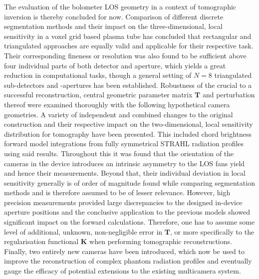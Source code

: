         The evaluation of the bolometer LOS geometry in a context of tomographic inversion is thereby concluded for now. Comparison of different discrete segmentation methods and their impact on the three-dimensional, local sensitivity in a voxel grid based plasma tube has concluded that rectangular and triangulated approaches are equally valid and applicable for their respective task. Their corresponding fineness or resolution was also found to be sufficient above four individual parts of both detector and aperture, which yields a great reduction in computational tasks, though a general setting of $N=8$ triangulated sub-detectors and -apertures has been established. Robustness of the crucial to a successful reconstruction, central geometric parameter matrix $\mathbf{T}$ and perturbation thereof were examined thoroughly with the following hypothetical camera geometries. A variety of independent and combined changes to the original construction and their respective impact on the two-dimensional, local sensitivity distribution for tomography have been presented. This included chord brightness forward model integrations from fully symmetrical STRAHL radiation profiles using said results. Throughout this it was found that the orientation of the cameras in the device introduces an intrinsic asymmetry to the LOS fans yield and hence their measurements. Beyond that, their individual deviation in local sensitivity  generally is of order of magnitude found while comparing segmentation methods and is therefore assumed to be of lesser relevance. However, high precision measurements provided large discrepancies to the designed in-device aperture positions and the conclusive application to the previous models showed significant impact on the forward calculations. Therefore, one has to assume some level of additional, unknown, non-negligible error in $\mathbf{T}$, or more specifically to the regularisation functional $\mathbf{K}$ when performing tomographic reconstructions. Finally, two entirely new cameras have been introduced, which now be used to improve the reconstruction of complex phantom radiation profiles and eventually gauge the efficacy of potential extensions to the existing multicamera system.%
%
